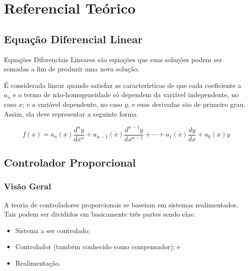 \documentclass[portugues, brazil, a4paper,12pt]{article}
\begin{document}
\section{Referencial Teórico} \label{sec:rt}
	
	\subsection{Equação Diferencial Linear}
		Equações Diferenciais Lineares são equações que suas soluções podem ser somadas a fim de produzir uma nova solução. 
		
		É considerada linear quando satisfaz as características de que cada coeficiente a $a_{n}$ e o termo de não-homogeneidade só dependem da variável independente, no caso $x$; e a variável dependente, no caso $y$, e suas derivadas são de primeiro grau. Assim, ela deve representar a seguinte forma
		
		\begin{equation}
			f(x) = a_{n}(x)\frac{d^{n}y}{dx^{n}} + a_{n-1}(x)\frac{d^{n-1}y}{dx^{n-1}} + \cdots +  a_{1}(x)\frac{dy}{dx} + a_0(x)y
		\end{equation}
		

		
	\subsection{Controlador Proporcional} \label{sec:controle_proporcional}
	
		\subsubsection{Visão Geral}
			A teoria de controladores proporcionais se baseiam em sistemas realimentados. Tais podem ser divididos em basicamente três partes sendo elas:
			\begin{itemize}
				\item Sistema a ser controlado;
				\item Controlador (também conhecido como compensador); e
				\item Realimentação.
			\end{itemize}
			
\end{document}
